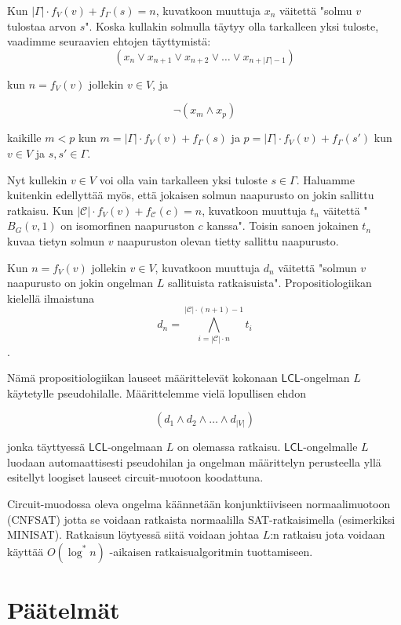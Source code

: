 \documentclass[12pt,finnish]{tktltiki2}
\theoremstyle{definition}
\theoremstyle{remark}
\newcommand*{\lcl}{\ensuremath{\mathsf{LCL}}}
\begin{document}
Kun $|\Gamma| \cdot f_V(v) + f_\Gamma(s) = n$, kuvatkoon muuttuja $x_n$ väitettä "solmu $v$ tulostaa arvon $s$". Koska kullakin solmulla täytyy olla tarkalleen yksi tuloste, vaadimme seuraavien ehtojen täyttymistä:
$$(x_n \vee x_{n+1} \vee x_{n+2} \vee \ldots \vee x_{n+|\Gamma|-1})$$

kun $n = f_V(v)$ jollekin $v \in V$, ja 

$$\lnot(x_m \land x_p)$$

kaikille $m < p$ kun $m = |\Gamma| \cdot f_V(v) + f_\Gamma(s)$ ja $p = |\Gamma| \cdot f_V(v) + f_\Gamma(s')$ kun $v \in V$ ja $s, s' \in \Gamma$.

Nyt kullekin $v \in V$ voi olla vain tarkalleen yksi tuloste $s \in \Gamma$. Haluamme kuitenkin edellyttää myös, että jokaisen solmun naapurusto on jokin sallittu ratkaisu. Kun $|\mathcal{C}| \cdot f_V(v) + f_\mathcal{C}(c) = n$, kuvatkoon muuttuja $t_n$ väitettä "$B_G(v, 1)$ on isomorfinen naapuruston $c$ kanssa". Toisin sanoen jokainen $t_n$ kuvaa tietyn solmun $v$ naapuruston olevan tietty sallittu naapurusto.


Kun $n = f_V(v)$ jollekin $v \in V$, kuvatkoon muuttuja $d_n$ väitettä "solmun $v$ naapurusto on jokin ongelman $L$ sallituista ratkaisuista". Propositiologiikan kielellä ilmaistuna
$$d_n = \bigwedge_{i = {|\mathcal{C}| \cdot n}}^{|\mathcal{C}| \cdot (n+1) - 1} t_i$$.

Nämä propositiologiikan lauseet määrittelevät kokonaan \lcl -ongelman $L$ käytetylle pseudohilalle. Määrittelemme vielä lopullisen ehdon

$$(d_1 \land d_2 \land \ldots \land d_{|V|})$$

jonka täyttyessä \lcl -ongelmaan $L$ on olemassa ratkaisu. \lcl -ongelmalle $L$ luodaan automaattisesti pseudohilan ja ongelman määrittelyn perusteella yllä esitellyt loogiset lauseet circuit-muotoon koodattuna.

Circuit-muodossa oleva ongelma käännetään konjunktiiviseen normaalimuotoon (CNFSAT) jotta se voidaan ratkaista normaalilla SAT-ratkaisimella (esimerkiksi MINISAT). Ratkaisun löytyessä siitä voidaan johtaa $L$:n ratkaisu jota voidaan käyttää $O(\log^* n)$ -aikaisen ratkaisualgoritmin tuottamiseen.


\section{Päätelmät}
\end{document}

